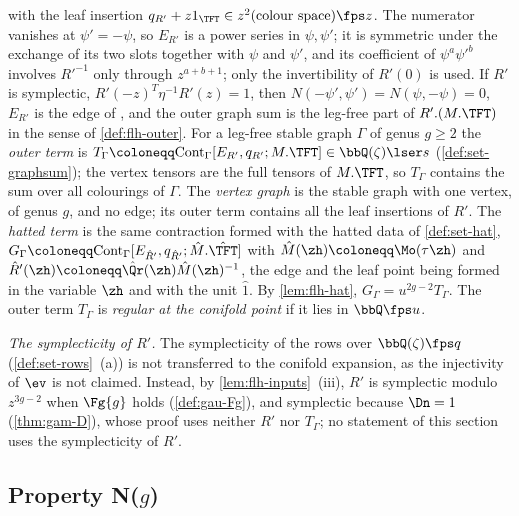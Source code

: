 \begin{defn}
with the leaf insertion $q_{R'}+z1_{\TFT}\in z^2(\text{colour space})\fps z$. The numerator vanishes at $\psi'=-\psi$, so $E_{R'}$ is a power series in $\psi,\psi'$; it is symmetric under the exchange of its two slots together with $\psi$ and $\psi'$, and its coefficient of $\psi^a\psi'^b$ involves $R'^{-1}$ only through $z^{a+b+1}$; only the invertibility of $R'(0)$ is used. If $R'$ is symplectic, $R'(-z)^T\eta^{-1}R'(z)=1$, then $N(-\psi',\psi')=N(\psi,-\psi)=0$, $E_{R'}$ is the edge of \cite[Def.~2.2]{PPZ15} \cite[Rem.~2.1, (6)]{PPZ15}, and the outer graph sum is the leg-free part of $R'.(M.\TFT)$ in the sense of \cref{def:flh-outer}. For a leg-free stable graph $\Gamma$ of genus $g\geq2$ the \emph{outer term} is $T_\Gamma\coloneqq\mathrm{Cont}_\Gamma[E_{R'},q_{R'};M.\TFT]\in\bbQ(\zeta)\lser s$ (\cref{def:set-graphsum}); the vertex tensors are the full tensors of $M.\TFT$, so $T_\Gamma$ contains the sum over all colourings of $\Gamma$. The \emph{vertex graph} is the stable graph with one vertex, of genus $g$, and no edge; its outer term contains all the leaf insertions of $R'$. The \emph{hatted term} is the same contraction formed with the hatted data of \cref{def:set-hat}, $G_\Gamma\coloneqq\mathrm{Cont}_\Gamma[E_{\hat R'},q_{\hat R'};\hat M.\hat\TFT]$ with $\hat M(\zh)\coloneqq\Mo(\tau\zh)$ and $\hat R'(\zh)\coloneqq\hat\Qr(\zh)\hat M(\zh)^{-1}$, the edge and the leaf point being formed in the variable $\zh$ and with the unit $\hat1$. By \cref{lem:flh-hat}, $G_\Gamma=u^{2g-2}T_\Gamma$. The outer term $T_\Gamma$ is \emph{regular at the conifold point} if it lies in $\bbQ\fps u$.

\emph{The symplecticity of $R'$.} The symplecticity of the rows over $\bbQ(\zeta)\fps q$ (\cref{def:set-rows}~(a)) is not transferred to the conifold expansion, as the injectivity of $\ev$ is not claimed. Instead, by \cref{lem:flh-inputs}~(iii), $R'$ is symplectic modulo $z^{3g-2}$ when $\Fg{g}$ holds (\cref{def:gau-Fg}), and symplectic because $\Dn=1$ (\cref{thm:gam-D}), whose proof uses neither $R'$ nor $T_\Gamma$; no statement of this section uses the symplecticity of $R'$.
\end{defn}

\subsection{Property N(\texorpdfstring{$g$}{g})}
\label{sec:set-N}

